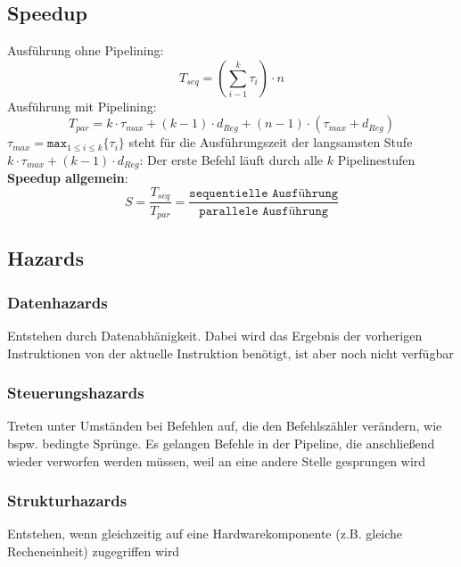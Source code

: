 	\subsection{Speedup}
		Ausführung ohne Pipelining:
		$$
			T_{seq}=(\displaystyle\sum^k_{i-1}\tau_i)\cdot n
		$$
		Ausführung mit Pipelining:
		$$
			T_{par}=k\cdot\tau_{max}+(k-1)\cdot d_{Reg}+(n-1)\cdot(\tau_{max}+d_{Reg})
		$$
		$\tau_{max}=\texttt{max}_{1\leq i\leq k}\{\tau_i\}$ steht für die Ausführungszeit der langsamsten Stufe\newline
		$k\cdot\tau_{max}+(k-1)\cdot d_{Reg}$: Der erste Befehl läuft durch alle $k$ Pipelinestufen \newline \newline
		\textbf{Speedup allgemein}:
		$$
			S=\frac{T_{seq}}{T_{par}}=\frac{\texttt{sequentielle Ausführung}}{\texttt{parallele Ausführung}}
		$$
	\subsection{Hazards}
		\subsubsection{Datenhazards}
			Entstehen durch Datenabhänigkeit. Dabei wird das Ergebnis der vorherigen Instruktionen von der aktuelle Instruktion benötigt, ist aber noch nicht verfügbar
		\subsubsection{Steuerungshazards}
			Treten unter Umständen bei Befehlen auf, die den Befehlszähler verändern, wie bspw. bedingte Sprünge. Es gelangen Befehle in der Pipeline, die anschließend wieder verworfen werden müssen, weil an eine andere Stelle gesprungen wird
		\subsubsection{Strukturhazards}
			Entstehen, wenn gleichzeitig auf eine Hardwarekomponente (z.B. gleiche Recheneinheit) zugegriffen wird